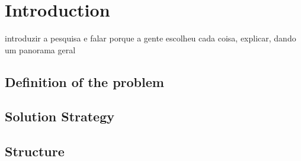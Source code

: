 


\chapter{Introduction} \label{chap1:introduction}
introduzir a pesquisa e falar porque a gente escolheu cada coisa, explicar, dando um panorama geral
\section{Definition of the problem} \label{sec1:problem}
\section{Solution Strategy} \label{sec1:solution_strategy}
\section{Structure} \label{sec1:structure}
